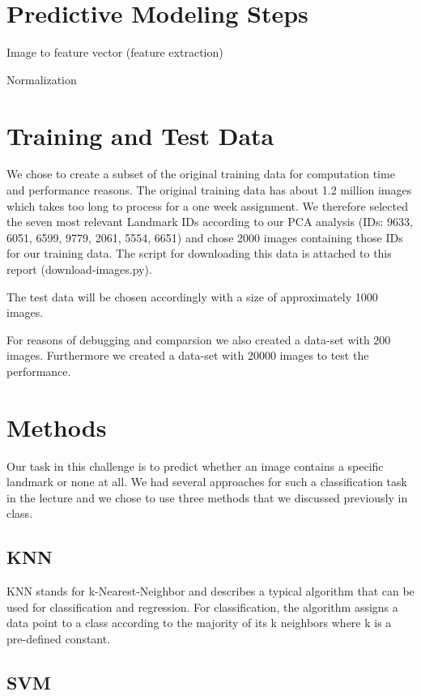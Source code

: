 \chapter{Predictive Modeling Steps}

Image to feature vector (feature extraction)

Normalization

\chapter{Training and Test Data}

We chose to create a subset of the original training data for computation time and performance reasons. The original training data has about 1.2 million images which takes too long to process for a one week assignment. We therefore selected the seven most relevant Landmark IDs according to our PCA analysis (IDs: 9633, 6051, 6599, 9779, 2061, 5554, 6651) and chose 2000 images containing those IDs for our training data. The script for downloading this data is attached to this report (download-images.py).

The test data will be chosen accordingly with a size of approximately 1000 images.

For reasons of debugging and comparsion we also created a data-set with 200 images. Furthermore we created a data-set with 20000 images to test the performance.  

\chapter{Methods}

Our task in this challenge is to predict whether an image contains a specific landmark or none at all. We had several approaches for such a classification task in the lecture and we chose to use three methods that we discussed previously in class.

\section{KNN}

KNN stands for k-Nearest-Neighbor and describes a typical algorithm that can be used for classification and regression. For classification, the algorithm assigns a data point to a class according to the majority of its k neighbors where k is a pre-defined constant.

\section{SVM}

